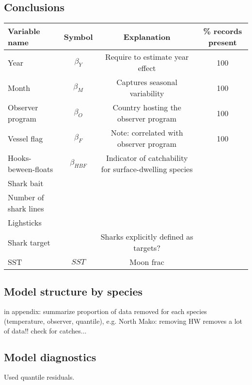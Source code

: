 \subsection{Conclusions}            


      
\clearpage     
      
      
      



\begin{table}[!h]
\label{tbl:glm-vars}
\begin{center}
\begin{tabular}{l|c|c|c}
Variable name & Symbol & Explanation & \% records present\\
\hline
\hline
Year & $\beta_Y$ & Require to estimate year effect & 100\\
Month & $\beta_M$ & Captures seasonal variability & 100\\
Observer program & $\beta_O$ & Country hosting the observer program & 100\\
Vessel flag & $\beta_F$ & Note: correlated with observer program & 100\\
Hooks-beween-floats& $\beta_{HBF}$ & Indicator of catchability for surface-dwelling species\\
Shark bait \\
Number of shark lines\\
Lighsticks \\
Shark target&&Sharks explicitly defined as targets?\\
SST & $SST$ & 
Moon frac & \\

\end{tabular}
\end{center}
\end{table}


\subsection{Model structure by species}
in appendix: summarize proportion of data removed for each species (temperature, observer, quantile), e.g. North Mako: removing HW removes a lot of data!! check for catches...

\subsection{Model diagnostics}
Used quantile residuals. 

